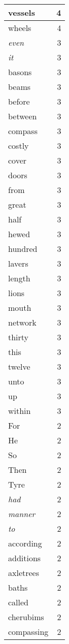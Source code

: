 \begin{center}
\begin{longtable}{l|r}
vessels & 4 \\ \hline
wheels & 4 \\ \hline
\emph{even} & 3 \\ \hline
\emph{it} & 3 \\ \hline
basons & 3 \\ \hline
beams & 3 \\ \hline
before & 3 \\ \hline
between & 3 \\ \hline
compass & 3 \\ \hline
costly & 3 \\ \hline
cover & 3 \\ \hline
doors & 3 \\ \hline
from & 3 \\ \hline
great & 3 \\ \hline
half & 3 \\ \hline
hewed & 3 \\ \hline
hundred & 3 \\ \hline
lavers & 3 \\ \hline
length & 3 \\ \hline
lions & 3 \\ \hline
mouth & 3 \\ \hline
network & 3 \\ \hline
thirty & 3 \\ \hline
this & 3 \\ \hline
twelve & 3 \\ \hline
unto & 3 \\ \hline
up & 3 \\ \hline
within & 3 \\ \hline
For & 2 \\ \hline
He & 2 \\ \hline
So & 2 \\ \hline
Then & 2 \\ \hline
Tyre & 2 \\ \hline
\emph{had} & 2 \\ \hline
\emph{manner} & 2 \\ \hline
\emph{to} & 2 \\ \hline
according & 2 \\ \hline
additions & 2 \\ \hline
axletrees & 2 \\ \hline
baths & 2 \\ \hline
called & 2 \\ \hline
cherubims & 2 \\ \hline
compassing & 2 \\ \hline

\end{longtable}
\end{center}
